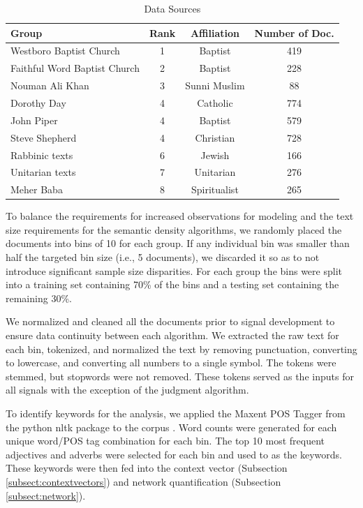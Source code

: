 \documentclass[11pt, a4paper]{article}
\begin{document}
\begin{table}[ht]
\caption{Data Sources}
\begin{center}
\begin{tabular}{lccc}
 \\  \hline
Group & Rank & Affiliation & Number of Doc.  \\ \hline
Westboro Baptist Church 		& 1 & Baptist		& 419 \\
Faithful Word Baptist Church	& 2 & Baptist		& 228 \\
Nouman Ali Khan			& 3 & Sunni Muslim	& 88 \\
Dorothy Day				& 4 & Catholic		& 774 \\
John Piper				& 4 & Baptist		& 579 \\
Steve Shepherd			& 4 & Christian		& 728 \\
Rabbinic texts				& 6 & Jewish		& 166 \\
Unitarian texts				& 7 & Unitarian		& 276 \\ 
Meher Baba				& 8 & Spiritualist	& 265 \\	

\end{tabular}
\end{center}
\label{table:data}
\end{table}

To balance the requirements for increased observations for modeling and the text size requirements for the semantic density algorithms, we randomly placed the documents into bins of 10 for each group. If any individual bin was smaller than half the targeted bin size (i.e., 5 documents), we discarded it so as to not introduce significant sample size disparities. For each group the bins were split into a training set containing 70\% of the bins and a testing set containing the remaining 30\%. 

We normalized and cleaned all the documents prior to signal development to ensure data continuity between each algorithm. We extracted the raw text for each bin, tokenized,  and normalized the text by removing punctuation, converting to lowercase, and converting all numbers to a single symbol. The tokens were stemmed, but stopwords were not removed. These tokens served as the inputs for all signals with the exception of the judgment algorithm.

To identify keywords for the analysis, we applied the Maxent POS Tagger from the python nltk package to the corpus \cite{loper2002}. Word counts were generated for each unique word/POS tag combination for each bin. The top 10 most frequent adjectives and adverbs were selected for each bin and used to as the keywords. These keywords were then fed into the context vector (Subsection \ref{subsect:contextvectors}) and network quantification (Subsection \ref{subsect:network}). 
\end{document}
